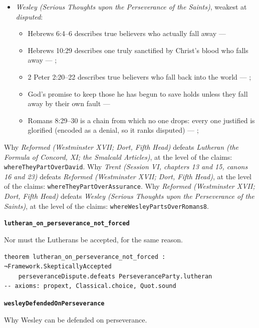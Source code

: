 \documentclass[11pt]{article}
\begin{document}
\begin{itemize}
\begin{itemize}
\end{itemize}
\item \emph{Wesley (Serious Thoughts upon the Perseverance of the Saints)}, weakest at \emph{disputed}:
\begin{itemize}
\item Hebrews 6:4–6 describes true believers who actually fall away --- \cite[449]{wesley-works-9-1827}
\item Hebrews 10:29 describes one truly sanctified by Christ’s blood who falls away --- \cite[448--449]{wesley-works-9-1827}; \cite[585]{wesley-explanatory-notes-nt}
\item 2 Peter 2:20–22 describes true believers who fall back into the world --- \cite[445--446]{wesley-works-9-1827}; \cite[625]{wesley-explanatory-notes-nt}
\item God’s promise to keep those he has begun to save holds unless they fall away by their own fault --- \cite[444--445]{wesley-works-9-1827}
\item Romans 8:29–30 is a chain from which no one drops: every one justified is glorified (encoded as a denial, so it ranks disputed) --- \cite[384]{wesley-explanatory-notes-nt}; \cite[413]{wesley-works-9-1827}
\end{itemize}
\end{itemize}
\noindent Why \emph{Reformed (Westminster XVII; Dort, Fifth Head)} defeats \emph{Lutheran (the Formula of Concord, XI; the Smalcald Articles)}, at the level of the claims: \texttt{where\allowbreak{}They\allowbreak{}Part\allowbreak{}Over\allowbreak{}David}.
\noindent Why \emph{Trent (Session VI, chapters 13 and 15, canons 16 and 23)} defeats \emph{Reformed (Westminster XVII; Dort, Fifth Head)}, at the level of the claims: \texttt{where\allowbreak{}They\allowbreak{}Part\allowbreak{}Over\allowbreak{}Assurance}.
\noindent Why \emph{Reformed (Westminster XVII; Dort, Fifth Head)} defeats \emph{Wesley (Serious Thoughts upon the Perseverance of the Saints)}, at the level of the claims: \texttt{where\allowbreak{}Wesley\allowbreak{}Parts\allowbreak{}Over\allowbreak{}Romans8}.
\par\medskip\noindent\textbf{\texttt{lutheran\_\allowbreak{}on\_\allowbreak{}perseverance\_\allowbreak{}not\_\allowbreak{}forced}}\par\nobreak\noindent
Nor must the Lutherans be accepted, for the same reason.

{\small\begin{verbatim}
theorem lutheran_on_perseverance_not_forced : ¬Framework.SkepticallyAccepted
    perseveranceDispute.defeats PerseveranceParty.lutheran
-- axioms: propext, Classical.choice, Quot.sound
\end{verbatim}}
\par\medskip\noindent\textbf{\texttt{wesley\allowbreak{}Defended\allowbreak{}On\allowbreak{}Perseverance}}\par\nobreak\noindent
Why Wesley can be defended on perseverance.
\end{document}
